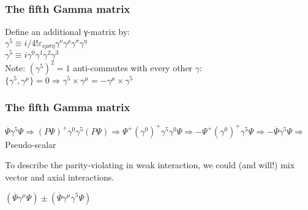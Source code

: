 \label{The fifth Gamma matrix}
\begin{frame}\frametitle{The fifth Gamma matrix}

Define an additional γ-matrix by:\\

$\gamma^5\equiv i/4! \varepsilon_{\nu \rho \sigma  \eta}  \gamma^\nu \gamma^\rho \gamma^\sigma \gamma^\eta$\\
$\gamma^5\equiv i\gamma^0\gamma^1\gamma^2\gamma^3$\\

Note:
$(\gamma^5)^2 = 1$
anti-commutes with every other $\gamma$:
$\{\gamma^5,\gamma^\mu\}=0 \Longrightarrow \gamma^5\times \gamma^\mu = - \gamma^\mu \times \gamma^5 $


\end{frame}



\label{The fifth Gamma matrix}

\begin{frame}\frametitle{The fifth Gamma matrix}



$\overline{\Psi} \gamma^5 \Psi \Longrightarrow (P\Psi)^{+} \gamma^0 \gamma^5  (P\Psi)  \Longrightarrow \Psi^{+} (\gamma^0 )^{+} \gamma^5 \gamma^0 \Psi \Longrightarrow - \Psi^{+}  (\gamma^0 )^{+}  \gamma^5  \Psi \Longrightarrow  - \overline{\Psi} \gamma^5 \Psi \Longrightarrow $ Pseudo-scalar 
 



To describe the parity-violating in weak interaction, we could (and will!) mix vector and axial interactions.

$(\overline{\Psi}  \gamma^\mu \Psi) \pm (\overline{\Psi}  \gamma^\mu \gamma^5 \Psi)$




\end{frame}
